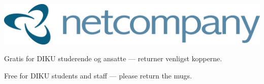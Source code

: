 \documentclass{article}
\begin{document}
\maketitle

\null
\vspace{-1.5cm}


\vspace{0.2in}

\begin{center}

\includegraphics[scale=1.1]{billeder/netcompany-logo.png}

\end{center}

\vspace{0.3in}

\begin{center}

\huge Gratis for DIKU studerende og ansatte --- returner venligst kopperne.

\english

\huge Free for DIKU students and staff --- please return the mugs.

\end{center}

\dansk

\underskriv
\end{document}

